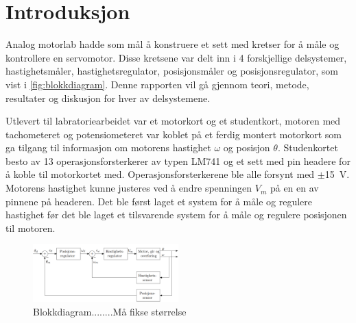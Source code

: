 \section{Introduksjon}\label{sec:intro}

Analog motorlab hadde som mål å konstruere et sett med kretser for å måle og kontrollere en servomotor. Disse kretsene var delt inn i 4 forskjellige delsystemer, hastighetsmåler, hastighetsregulator, posisjonsmåler og posisjonsregulator, som vist i \autoref{fig:blokkdiagram}. Denne rapporten vil gå gjennom teori, metode, resultater og diskusjon for hver av delsystemene.

Utlevert til labratoriearbeidet var et motorkort og et studentkort, motoren med tachometeret og potensiometeret var koblet på et ferdig montert motorkort som ga tilgang til informasjon om motorens hastighet $\omega$ og posisjon $\theta$. Studenkortet besto av 13 operasjonsforsterkerer av typen LM741\cite{LM741} og et sett med pin headere for å koble til motorkortet med. Operasjonsforsterkerene ble alle forsynt med $\pm${\SI{15}{\volt}}. Motorens hastighet kunne justeres ved å endre spenningen $V_m$ på en en av pinnene på headeren. Det ble først laget et system for å måle og regulere hastighet før det ble laget et tilsvarende system for å måle og regulere posisjonen til motoren.




\begin{figure}[b]
    \centering
    \includegraphics[width = 0.5\textwidth]{figurer/Blokkdiagram.png}
    \caption{Blokkdiagram........Må fikse størrelse}
    \label{fig:blokkdiagram}
\end{figure}








